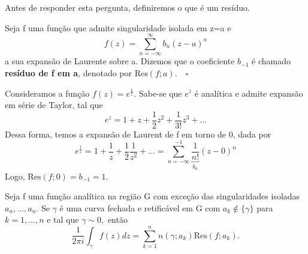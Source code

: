 \documentclass[complex.tex]{subfiles}
\begin{document}
Antes de responder esta pergunta, definiremos o que é um resíduo.
\begin{def*}
	Seja f uma função que admite singularidade isolada em z=a e
	\[
		f(z) = \sum\limits_{n=-\infty}^{\infty}b_{n}(z-a)^{n}
	\]
	a sua expansão de Laurente sobre a. Dizemos que o coeficiente \(b_{-1}\) é chamado \textbf{resíduo de f em a},
	denotado por \(\mathrm{Res}(f; a).\quad \square\)
\end{def*}
\begin{example}
	Consideramos a função \(f(z) = e^{\frac{1}{z}}.\) Sabe-se que \(e^{z}\) é analítica e admite expansão em série
	de Taylor, tal que
	\[
		e^{z} = 1 + z + \frac{1}{2}z^{2} + \frac{1}{3!}z^{3} + \dotsc
	\]
	Dessa forma, temos a expansão de Laurent de f em torno de 0, dada por
	\[
		e^{\frac{1}{z}} = 1 + \frac{1}{z} + \frac{1}{2}\frac{1}{z^{2}}+\dotsc  = \sum\limits_{n=-\infty}^{-1}\underbrace{\frac{1}{n!}}_{b_{n}}(z-0)^{n}
	\]
	Logo, \(\mathrm{Res}(f; 0) = b_{-1} = 1.\)
\end{example}
\hypertarget{residue}{ \begin{theorem*}
		Seja f uma função analítica na região G com exceção das singularidades isoladas \(a_{n},\dotsc ,a_{n}.\) Se \(\gamma \) é uma curva fechada e retificável
		em G com \(a_{k}\not\in\{\gamma \}\) para \(k=1, \dotsc , n\) e tal que \(\gamma \sim 0,\) então
		\[
			\frac{1}{2\pi i}\int_{\gamma }^{}f(z)dz = \sum\limits_{k=1}^{n}n(\gamma; a_{k})\mathrm{Res}(f; a_{k}).
		\]
	\end{theorem*}}
\end{document}
